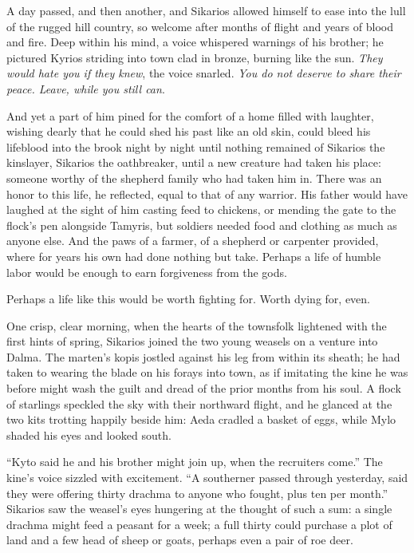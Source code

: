 \secdiv

A day passed, and then another, and Sikarios allowed himself to ease into the lull of the rugged hill country, so welcome after months of flight and years of blood and fire. Deep within his mind, a voice whispered warnings of his brother; he pictured Kyrios striding into town clad in bronze, burning like the sun. \emph{They would hate you if they knew}, the voice snarled. \emph{You do not deserve to share their peace. Leave, while you still can}.

And yet a part of him pined for the comfort of a home filled with laughter, wishing dearly that he could shed his past like an old skin, could bleed his lifeblood into the brook night by night until nothing remained of Sikarios the kinslayer, Sikarios the oathbreaker, until a new creature had taken his place: someone worthy of the shepherd family who had taken him in. There was an honor to this life, he reflected, equal to that of any warrior. His father would have laughed at the sight of him casting feed to chickens, or mending the gate to the flock's pen alongside Tamyris, but soldiers needed food and clothing as much as anyone else. And the paws of a farmer, of a shepherd or carpenter provided, where for years his own had done nothing but take. Perhaps a life of humble labor would be enough to earn forgiveness from the gods.

Perhaps a life like this would be worth fighting for. Worth dying for, even.

One crisp, clear morning, when the hearts of the townsfolk lightened with the first hints of spring, Sikarios joined the two young weasels on a venture into Dalma. The marten's kopis jostled against his leg from within its sheath; he had taken to wearing the blade on his forays into town, as if imitating the kine he was before might wash the guilt and dread of the prior months from his soul. A flock of starlings speckled the sky with their northward flight, and he glanced at the two kits trotting happily beside him: Aeda cradled a basket of eggs, while Mylo shaded his eyes and looked south.

``Kyto said he and his brother might join up, when the recruiters come.'' The kine's voice sizzled with excitement. ``A southerner passed through yesterday, said they were offering thirty drachma to anyone who fought, plus ten per month.'' Sikarios saw the weasel's eyes hungering at the thought of such a sum: a single drachma might feed a peasant for a week; a full thirty could purchase a plot of land and a few head of sheep or goats, perhaps even a pair of roe deer.

